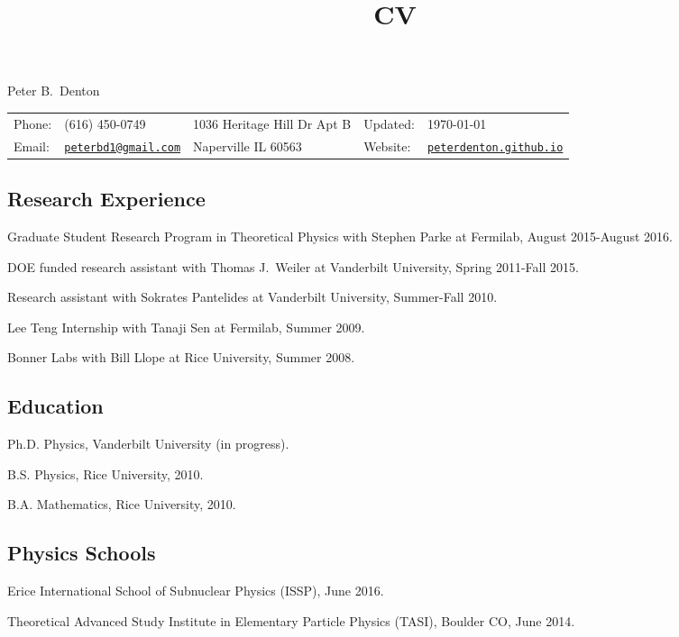 \documentclass[letterpaper]{article}
\title{CV}
\newif\ifhtlatex
\def\name{Peter B.~Denton}
\renewenvironment{itemize}{
\begin{list}{}{
\setlength{\leftmargin}{1.5em}
}
}{
\end{list}
}
\begin{document}
\ifhtlatex
\Tag{TITLE+}{CV}
\fi

{\huge \name}

\vspace{0.1in}

\begin{tabular}{ll|l|ll}
Phone: & (616) 450-0749 & 1036 Heritage Hill Dr Apt B & Updated: & \today\\
Email: & \href{mailto:peterbd1@gmail.com}{\tt peterbd1@gmail.com} & Naperville IL 60563 & Website: & 
\href{http://peterdenton.github.io}{\tt peterdenton.github.io}
\end{tabular}

\subsection*{Research Experience}
\begin{itemize}
\item Graduate Student Research Program in Theoretical Physics with Stephen Parke at Fermilab, August 2015-August 2016.
\item DOE funded research assistant with Thomas J.~Weiler at Vanderbilt University, Spring 2011-Fall 2015.
\item Research assistant with Sokrates Pantelides at Vanderbilt University, Summer-Fall 2010.
\item Lee Teng Internship with Tanaji Sen at Fermilab, Summer 2009.
\item Bonner Labs with Bill Llope at Rice University, Summer 2008.
\end{itemize}

\subsection*{Education}
\begin{itemize}
\item Ph.D. Physics, Vanderbilt University (in progress).
\item B.S. Physics, Rice University, 2010.
\item B.A. Mathematics, Rice University, 2010.
\end{itemize}

\subsection*{Physics Schools}
\begin{itemize}
\item Erice International School of Subnuclear Physics (ISSP), June 2016.
\item Theoretical Advanced Study Institute in Elementary Particle Physics (TASI), Boulder CO, June 2014.
\end{itemize}
\end{document}
